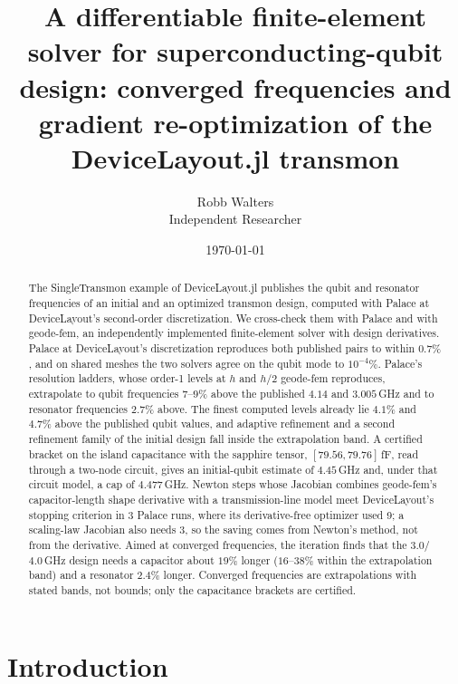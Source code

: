 \documentclass{anvil-paper}
\title{A differentiable finite-element solver for superconducting-qubit
design: converged frequencies and gradient re-optimization of the
DeviceLayout.jl transmon}
\author{Robb Walters\\
  {\normalsize Independent Researcher}}
\date{\today}
\begin{document}
\maketitle

\begin{abstract}
The SingleTransmon example of DeviceLayout.jl publishes the qubit and
resonator frequencies of an initial and an optimized transmon design,
computed with Palace at DeviceLayout's second-order discretization. We
cross-check them with Palace and with geode-fem, an independently
implemented finite-element solver with design derivatives.
Palace at DeviceLayout's discretization reproduces both published pairs to
within $0.7\%$, and on shared meshes the two solvers agree on the qubit
mode to $10^{-4}\%$. Palace's resolution ladders, whose order-1 levels at
$h$ and $h/2$ geode-fem reproduces, extrapolate to qubit frequencies
$7$--$9\%$ above the published $4.14$ and $3.005$\,GHz and to resonator
frequencies $2.7\%$ above. The finest computed levels already lie $4.1\%$
and $4.7\%$ above the published qubit values, and adaptive refinement and a
second refinement family of the initial design fall inside the
extrapolation band. A certified bracket on the island capacitance with the
sapphire tensor, $[79.56, 79.76]$\,fF, read through a two-node circuit,
gives an initial-qubit estimate of $4.45$\,GHz and, under that circuit
model, a cap of $4.477$\,GHz. Newton steps whose Jacobian combines
geode-fem's capacitor-length shape derivative with a transmission-line
model meet DeviceLayout's stopping criterion in 3 Palace runs, where its
derivative-free optimizer used 9; a scaling-law Jacobian also needs 3, so
the saving comes from Newton's method, not from the derivative. Aimed at
converged frequencies, the iteration finds that the $3.0$/$4.0$\,GHz design
needs a capacitor about $19\%$ longer ($16$--$38\%$ within the
extrapolation band) and a resonator $2.4\%$ longer. Converged
frequencies are extrapolations with stated bands, not bounds; only the
capacitance brackets are certified.
\end{abstract}

\section{Introduction}
\label{sec:intro}
\end{document}
